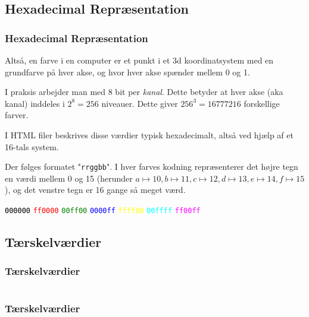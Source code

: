 \subsection{Hexadecimal Repræsentation}
\begin{frame}
    \frametitle{Hexadecimal Repræsentation}
    \vspace{3mm}
    Altså, en farve i en computer er et punkt i et 3d koordinatsystem med en grundfarve på hver akse, og hvor hver akse spænder mellem 0 og 1.
    
    \vspace{5mm}
    I praksis arbejder man med 8 bit per \textsl{kanal}. Dette betyder at hver akse (aka kanal) inddeles i $2^8=256$ niveauer. Dette giver $256^3=16777216$ forskellige farver.
    
    \vspace{5mm}
    I HTML filer beskrives disse værdier typisk hexadecimalt, altså ved hjælp af et 16-tals system. 
    
    \vspace{5mm}
    Der følges formatet "\texttt{rrggbb}". I hver farves kodning repræsenterer det højre tegn en værdi mellem 0 og 15 (herunder ${a\mapsto 10, b \mapsto 11, c \mapsto 12, d \mapsto 13, e \mapsto 14, f \mapsto 15}$), og det venstre tegn er 16 gange så meget værd.
    
     \vspace{5mm}
     \textcolor{black}{\texttt{000000}}
     \textcolor{red}{\texttt{ff0000}}
     \textcolor{green}{\texttt{00ff00}}
     \textcolor{blue}{\texttt{0000ff}}
     \textcolor{yellow}{\texttt{ffff00}}
     \textcolor{cyan}{\texttt{00ffff}}
     \textcolor{magenta}{\texttt{ff00ff}}
\end{frame}


\subsection{Tærskelværdier}
\begin{frame}
    \frametitle{Tærskelværdier}
    \vspace{-2mm}
    \inputminted[fontsize=\tiny,highlightlines={}]{javascript}{../src/frontend/part5_threshold/logic.js}
\end{frame}
\begin{frame}
    \frametitle{Tærskelværdier}
    \vspace{-2mm}
    \inputminted[fontsize=\tiny,highlightlines={9-15,26}]{javascript}{../src/frontend/part5_threshold/logic.js}
\end{frame}

